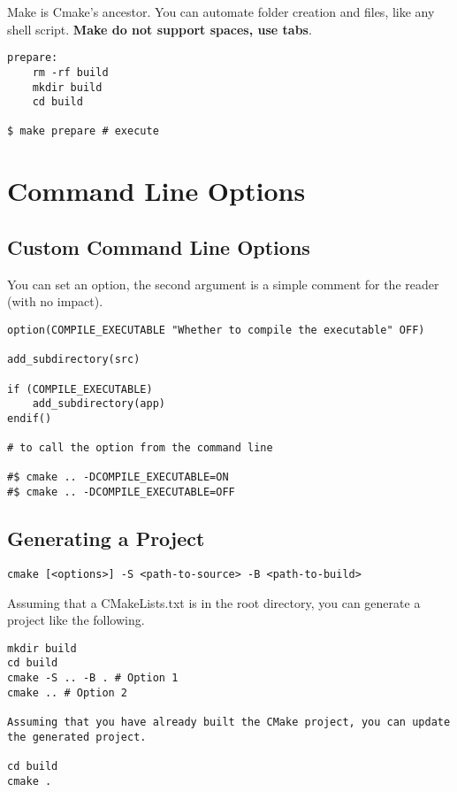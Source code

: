 \documentclass[openany]{report}
\begin{document}
Make is Cmake's ancestor. You can automate folder creation and files,
like any shell script.
\textbf{Make do not support spaces, use tabs}.

\begin{verbatim}
prepare:
    rm -rf build
    mkdir build
    cd build

$ make prepare # execute 
\end{verbatim}

\section{Command Line Options}

\subsection{Custom Command Line Options}

You can set an option,
the second argument is a simple comment for the reader (with no impact).

\begin{verbatim}
option(COMPILE_EXECUTABLE "Whether to compile the executable" OFF)

add_subdirectory(src)

if (COMPILE_EXECUTABLE)
    add_subdirectory(app)
endif()

# to call the option from the command line

#$ cmake .. -DCOMPILE_EXECUTABLE=ON
#$ cmake .. -DCOMPILE_EXECUTABLE=OFF
\end{verbatim}


\subsection{Generating a Project}

\begin{verbatim}
cmake [<options>] -S <path-to-source> -B <path-to-build>
\end{verbatim}

Assuming that a CMakeLists.txt is in the root directory, you can generate a project like the following.

\begin{verbatim}
mkdir build
cd build
cmake -S .. -B . # Option 1
cmake .. # Option 2

Assuming that you have already built the CMake project, you can update the generated project.

cd build
cmake .
\end{verbatim}
\end{document}
